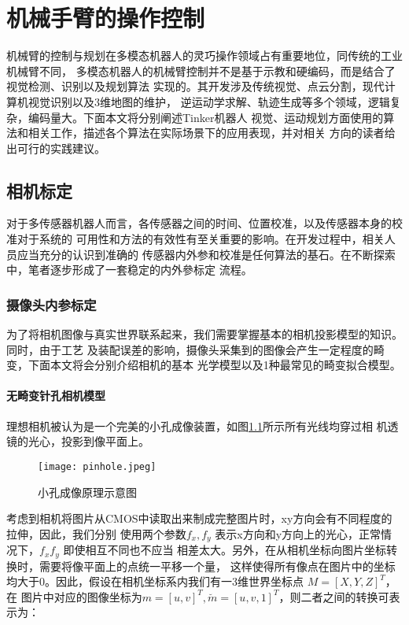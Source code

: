 \chapter{机械手臂的操作控制}
\label{cha:arm}

机械臂的控制与规划在多模态机器人的灵巧操作领域占有重要地位，同传统的工业机械臂不同，
多模态机器人的机械臂控制并不是基于示教和硬编码，而是结合了视觉检测、识别以及规划算法
实现的。其开发涉及传统视觉、点云分割，现代计算机视觉识别以及3维地图的维护，
逆运动学求解、轨迹生成等多个领域，逻辑复杂，编码量大。下面本文将分别阐述Tinker机器人
视觉、运动规划方面使用的算法和相关工作，描述各个算法在实际场景下的应用表现，并对相关
方向的读者给出可行的实践建议。

\section{相机标定}

对于多传感器机器人而言，各传感器之间的时间、位置校准，以及传感器本身的校准对于系统的
可用性和方法的有效性有至关重要的影响。在开发过程中，相关人员应当充分的认识到准确的
传感器内外参和校准是任何算法的基石。在不断探索中，笔者逐步形成了一套稳定的内外參标定
流程。

\subsection{摄像头内参标定}
\label{subsec:cam_intrinsic}

为了将相机图像与真实世界联系起来，我们需要掌握基本的相机投影模型的知识。同时，由于工艺
及装配误差的影响，摄像头采集到的图像会产生一定程度的畸变，下面本文将会分别介绍相机的基本
光学模型以及1种最常见的畸变拟合模型。

\subsubsection{无畸变针孔相机模型}
\label{subsec:pinhole_cam}

理想相机被认为是一个完美的小孔成像装置，如图\ref{fig:pinhole}所示所有光线均穿过相
机透镜的光心，投影到像平面上。

\begin{figure}[ht] %
  \centering
  \texttt{[image: pinhole.jpeg]}
  \caption{小孔成像原理示意图}
  \label{fig:pinhole}
\end{figure}

考虑到相机将图片从CMOS中读取出来制成完整图片时，xy方向会有不同程度的拉伸，因此，我们分别
使用两个参数$f_x, f_y$ 表示x方向和y方向上的光心，正常情况下，$f_x f_y$ 即使相互不同也不应当
相差太大。另外，在从相机坐标向图片坐标转换时，需要将像平面上的点统一平移一个量，
这样使得所有像点在图片中的坐标均大于0。因此，假设在相机坐标系内我们有一3维世界坐标点
$M = [X, Y, Z]^T$，在
图片中对应的图像坐标为$m = [u, v]^T, \breve{m} = [u, v, 1]^T$，则二者之间的转换可表示为：


